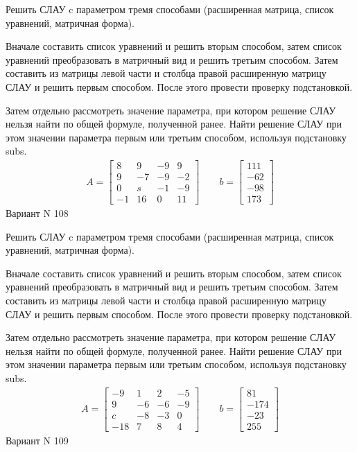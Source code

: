 \documentclass[11pt]{report}
\begin{document}
Решить СЛАУ c параметром тремя способами (расширенная матрица, список уравнений, матричная форма).

Вначале составить список уравнений и решить вторым способом,
затем список уравнений преобразовать в матричный вид и решить третьим способом.
Затем составить из матрицы левой части и столбца правой расширенную матрицу СЛАУ и решить первым способом.
После этого провести проверку подстановкой.

Затем отдельно рассмотреть значение параметра, при котором решение СЛАУ нельзя найти по общей формуле,
полученной ранее.
Найти решение СЛАУ при этом значении параметра первым или третьим способом, используя подстановку subs.
\begin{align*}
    A = \left[\begin{matrix}8 & 9 & -9 & 9\\9 & -7 & -9 & -2\\0 & s & -1 & -9\\-1 & 16 & 0 & 11\end{matrix}\right]
\qquad b = \left[\begin{matrix}111\\-62\\-98\\173\end{matrix}\right]
\end{align*}
\newpage
Вариант N 108


Решить СЛАУ c параметром тремя способами (расширенная матрица, список уравнений, матричная форма).

Вначале составить список уравнений и решить вторым способом,
затем список уравнений преобразовать в матричный вид и решить третьим способом.
Затем составить из матрицы левой части и столбца правой расширенную матрицу СЛАУ и решить первым способом.
После этого провести проверку подстановкой.

Затем отдельно рассмотреть значение параметра, при котором решение СЛАУ нельзя найти по общей формуле,
полученной ранее.
Найти решение СЛАУ при этом значении параметра первым или третьим способом, используя подстановку subs.
\begin{align*}
    A = \left[\begin{matrix}-9 & 1 & 2 & -5\\9 & -6 & -6 & -9\\c & -8 & -3 & 0\\-18 & 7 & 8 & 4\end{matrix}\right]
\qquad b = \left[\begin{matrix}81\\-174\\-23\\255\end{matrix}\right]
\end{align*}
\newpage
Вариант N 109
\end{document}
